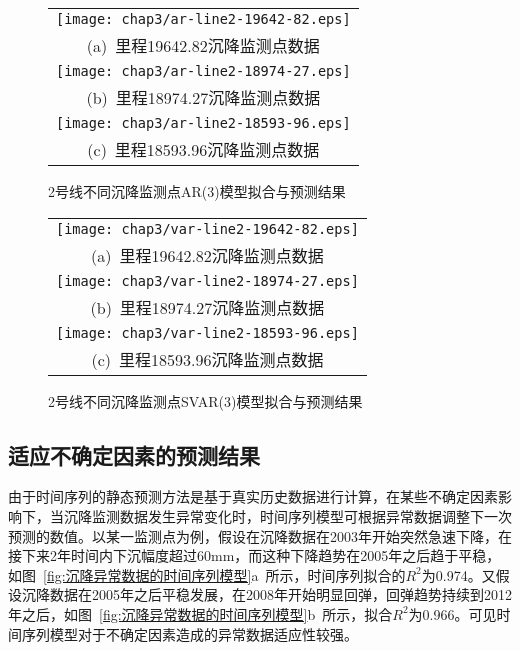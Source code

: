 \begin{figure}[htbp] 
    \centering 
    \begin{tabular}{c} 
        \texttt{[image: chap3/ar-line2-19642-82.eps]} \\ 
        (a)~里程19642.82沉降监测点数据 \\
        \texttt{[image: chap3/ar-line2-18974-27.eps]} \\ 
        (b)~里程18974.27沉降监测点数据 \\
        \texttt{[image: chap3/ar-line2-18593-96.eps]} \\ 
        (c)~里程18593.96沉降监测点数据 \\
    \end{tabular}
    \caption{2号线不同沉降监测点AR(3)模型拟合与预测结果} 
    \label{fig:2号线不同沉降监测点AR3模型拟合与预测结果} 
\end{figure}

\begin{figure}[htbp] 
    \centering 
    \begin{tabular}{c} 
        \texttt{[image: chap3/var-line2-19642-82.eps]} \\ 
        (a)~里程19642.82沉降监测点数据 \\
        \texttt{[image: chap3/var-line2-18974-27.eps]} \\ 
        (b)~里程18974.27沉降监测点数据 \\
        \texttt{[image: chap3/var-line2-18593-96.eps]} \\ 
        (c)~里程18593.96沉降监测点数据 \\
    \end{tabular}
    \caption{2号线不同沉降监测点SVAR(3)模型拟合与预测结果} 
    \label{fig:2号线不同沉降监测点SVAR3模型拟合与预测结果} 
\end{figure}

\subsection{适应不确定因素的预测结果}

由于时间序列的静态预测方法是基于真实历史数据进行计算，在某些不确定因素影响下，当沉降监测数据发生异常变化时，时间序列模型可根据异常数据调整下一次预测的数值。以某一监测点为例，假设在沉降数据在2003年开始突然急速下降，在接下来2年时间内下沉幅度超过60mm，而这种下降趋势在2005年之后趋于平稳，如图~\ref{fig:沉降异常数据的时间序列模型}a~所示，时间序列拟合的$R^2$为0.974。又假设沉降数据在2005年之后平稳发展，在2008年开始明显回弹，回弹趋势持续到2012年之后，如图~\ref{fig:沉降异常数据的时间序列模型}b~所示，拟合$R^2$为0.966。可见时间序列模型对于不确定因素造成的异常数据适应性较强。

